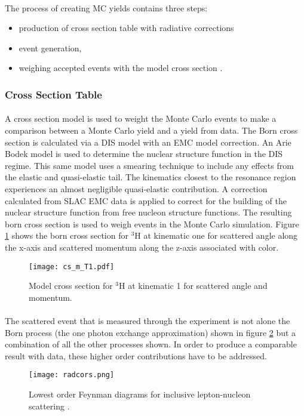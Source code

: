 \paragraph{}The process of creating MC yields contains three steps: 
\begin{itemize}
	\item production of cross section table with radiative corrections
	\item event generation,
	\item weighing accepted events with the model cross section .
\end{itemize} 
\subsubsection{Cross Section Table}
\vspace{-10pt}\paragraph{} A cross section model is used to weight the Monte Carlo events to make a comparison between a Monte Carlo yield and a yield from data. The Born cross section is calculated via a DIS model with an EMC model correction. An Arie Bodek model \cite{DISmodel} is used to determine the nuclear structure function in the DIS regime. This same model uses a smearing technique to include any effects from the elastic and quasi-elastic tail. The kinematics closest to the resonance region experiences an almost negligible quasi-elastic contribution. A correction calculated from SLAC EMC data is applied to correct for the building of the nuclear structure function from free nucleon structure functions. The resulting born cross section is used to weigh events in the Monte Carlo simulation. Figure \ref{MCS} shows the born cross section for $^3$H at kinematic one for scattered angle along the x-axis and scattered momentum along the z-axis associated with color.  

\begin{figure}
	\caption{Model cross section for $^3$H at kinematic 1 for scattered angle and momentum. \label{MCS}}
	\texttt{[image: cs\_m\_T1.pdf]}
\end{figure}
\paragraph{} The scattered event that is measured through the experiment is not alone the Born process (the one photon exchange approximation) shown in figure \ref{fig:radcors} but a combination of all the other processes shown. In order to produce a comparable result with data, these higher order contributions have to be addressed.
\begin{figure}[h]
	\centering
	\texttt{[image: radcors.png]}
	\caption{Lowest order Feynman diagrams for inclusive lepton-nucleon scattering \cite{Ajth}.}
	\label{fig:radcors}
\end{figure} 

